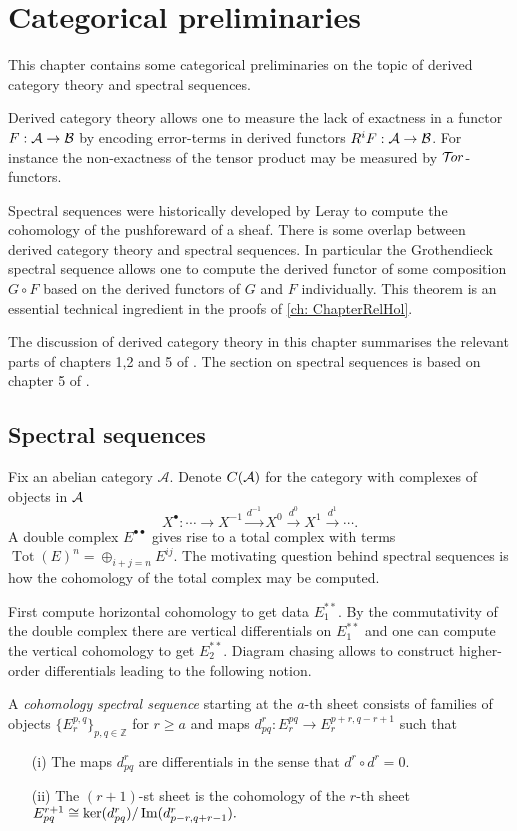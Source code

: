 \chapter{Categorical preliminaries}\label{ch: ChapterCategory}
This chapter contains some categorical preliminaries on the topic of derived category theory and spectral sequences.

Derived category theory allows one to measure the lack of exactness in a functor $F:\AA \to \mathcal{B}$ by encoding error-terms in derived functors $R^iF:\AA \to \mathcal{B}$.
For instance the non-exactness of the tensor product may be measured by $\Tor$-functors.

Spectral sequences were historically developed by Leray to compute the cohomology of the pushforeward of a sheaf.
There is some overlap between derived category theory and spectral sequences.
In particular the Grothendieck spectral sequence allows one to compute the derived functor of some composition $G\circ F$ based on the derived functors of $G$ and $F$ individually.
This theorem is an essential technical ingredient in the proofs of \cref{ch: ChapterRelHol}.

The discussion of derived category theory in this chapter summarises the relevant parts of chapters 1,2 and 5 of \cite{dimca2004sheaves}.
The section on spectral sequences is based on chapter 5 of \cite{weibel1995introduction}.
\section{Spectral sequences}
Fix an abelian category $\mathcal{A}$.
Denote $C(\AA)$ for the category with complexes of objects in $\AA$
$$X^\bullet :\cdots \xrightarrow{}  X^{-1}\xrightarrow{d^{-1}} X^0 \xrightarrow{d^{0}} X^1\xrightarrow{d^1} \cdots.$$
A double complex $E^{\bullet \bullet}$ gives rise to a total complex with terms  $\operatorname{Tot}(E)^n = \oplus_{i+j=n} E^{ij}$.
The motivating question behind spectral sequences is how the cohomology of the total complex may be computed.

First compute horizontal cohomology to get data $E^{**}_1$.
By the commutativity of the double complex there are vertical differentials on $E^{**}_1$ and one can compute the vertical cohomology to get $E^{**}_2$.
Diagram chasing allows to construct higher-order differentials leading to the following notion.
\begin{definition}
  A {\it cohomology spectral sequence} starting at the $a$-th sheet consists of families of objects $ \{E^{p,q}_r\}_{p,q\in \mathbb{Z}}$ for $r\geq a$ and maps
  $d_{pq}^r : E^{pq}_r \to E^{p+r,q-r+1}_r $
  such that
  \begin{enumerate}
    \item[(i)]  The maps $d^r_{pq}$ are differentials in the sense that
    $d^r \circ d^r = 0.$
    \item[(ii)] The $(r+1)$-st sheet is the cohomology of the $r$-th sheet
    $E_{pq}^{r+1} \cong \ker(d_{pq}^r)/ \img(d_{p-r,q+r-1}^r).$
  \end{enumerate}
\end{definition}

